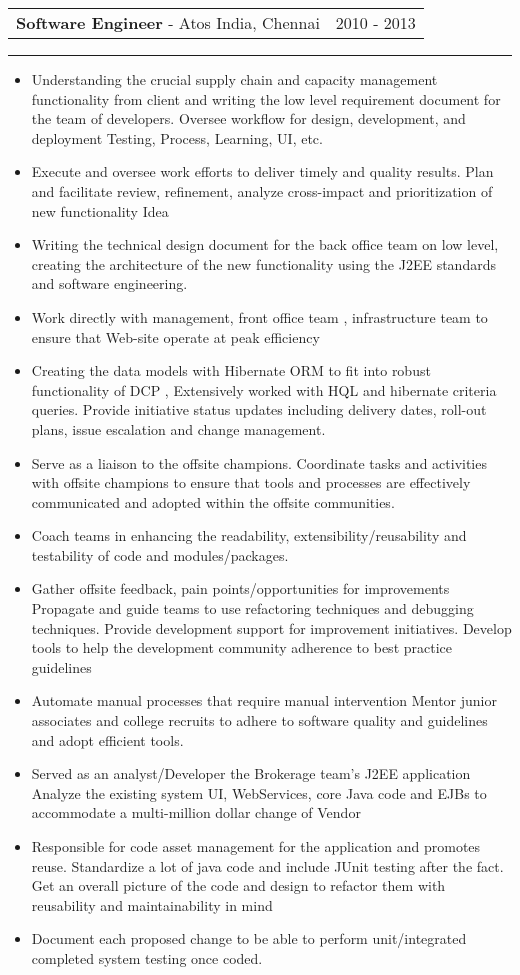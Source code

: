 \documentclass[10pt,A4]{article}
\newcommand{\cvevent}[4]
{

\begin{tabular*}{1\textwidth}{p{13.6cm}  x{3.9cm}}
	\textbf{#2} - \textcolor{bgcol}{#3} &   \vspace{2.0pt}\textcolor{sectcol}{#1}
\end{tabular*}

\vspace{-8pt}
\textcolor{softcol}{\hrule}
\vspace{6pt}

  #4 

}
\begin{document}
\cvevent{2010 - 2013}
{Software Engineer}
{Atos India, Chennai}
{

\begin{itemize}
\item Understanding the crucial supply chain and capacity management functionality from
client and writing the low level requirement document for the team of developers.
Oversee workflow for design, development, and deployment Testing, Process, Learning,
UI, etc.
\item Execute and oversee work efforts to deliver timely and quality results.
Plan and facilitate review, refinement, analyze cross-impact and prioritization of new
functionality Idea
\item Writing the technical design document for the back office team on low level, creating
the architecture of the new functionality using the J2EE standards and software
engineering.
\item Work directly with management, front office team , infrastructure team to ensure that
Web-site operate at peak efficiency
\item Creating the data models with Hibernate ORM to fit into robust functionality of DCP ,
Extensively worked with HQL and hibernate criteria queries.
Provide initiative status updates including delivery dates, roll-out plans, issue escalation
and change management.
\item Serve as a liaison to the offsite champions. Coordinate tasks and activities with offsite
champions to ensure that tools and processes are effectively communicated and
adopted within the offsite communities.
\item Coach teams in enhancing the readability, extensibility/reusability and testability of
code and modules/packages.
\item Gather offsite feedback, pain points/opportunities for improvements
Propagate and guide teams to use refactoring techniques and debugging techniques.
Provide development support for improvement initiatives.
Develop tools to help the development community adherence to best practice
guidelines
\item Automate manual processes that require manual intervention
Mentor junior associates and college recruits to adhere to software quality and
guidelines and adopt efficient tools.
\item Served as an analyst/Developer the Brokerage team's J2EE application
Analyze the existing system UI, WebServices, core Java code and EJBs to accommodate
a multi-million dollar change of Vendor

\item Responsible for code asset management for the application and promotes reuse.
Standardize a lot of java code and include JUnit testing after the fact.
Get an overall picture of the code and design to refactor them with reusability and
maintainability in mind
\item Document each proposed change to be able to perform unit/integrated completed
system testing once coded.
\end{itemize}
}
\end{document}
